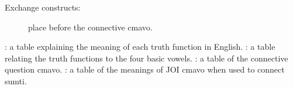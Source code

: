 Exchange constructs:
\begin{description}
\item[] place  before the connective cmavo.
\end{description}



 : a table explaining the meaning
    of each truth function in English. : a table relating the truth
    functions to the four basic vowels. : a table of the connective
    question cmavo. : a table of the meanings of
    JOI cmavo when used to connect sumti.